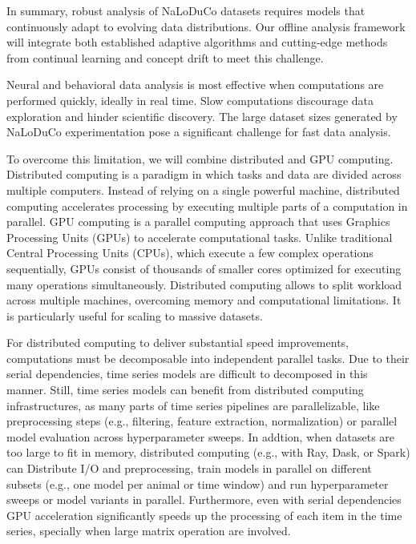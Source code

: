 In summary, robust analysis of NaLoDuCo datasets requires models that
continuously adapt to evolving data distributions. Our offline analysis
framework will integrate both established adaptive algorithms and cutting-edge
methods from continual learning and concept drift to meet this challenge.


Neural and behavioral data analysis is most effective when computations are
performed quickly, ideally in real time. Slow computations discourage data
exploration and hinder scientific discovery. The large dataset sizes generated by
NaLoDuCo experimentation pose a significant challenge for fast data analysis.

To overcome this limitation, we will combine distributed and GPU computing.
%
Distributed computing is a paradigm
in which tasks and data are divided across multiple computers. Instead of
relying on a single powerful machine, distributed computing accelerates
processing by executing multiple parts of a computation in parallel.
%
GPU computing is a parallel computing approach that uses Graphics Processing
Units (GPUs) to accelerate computational tasks. Unlike traditional Central
Processing Units (CPUs), which execute a few complex operations sequentially,
GPUs consist of thousands of smaller cores optimized for executing many
operations simultaneously.
%
%
Distributed computing allows to split workload across multiple machines,
overcoming memory and computational limitations. It is particularly useful for
scaling to massive datasets.

For distributed computing to deliver substantial speed improvements,
computations must be decomposable into independent parallel tasks. Due to their
serial dependencies, time series models are difficult to decomposed in this
manner.
%
Still, time series models can benefit from distributed computing
infrastructures, as many parts of time series pipelines are parallelizable,
like preprocessing steps (e.g., filtering, feature extraction, normalization)
or parallel model evaluation across hyperparameter sweeps.
%
In addtion,  when datasets are too large to fit in memory, distributed
computing (e.g., with Ray, Dask, or Spark) can Distribute I/O and
preprocessing, train models in parallel on different subsets (e.g., one model
per animal or time window) and run hyperparameter sweeps or model variants in
parallel.
%
Furthermore, even with serial dependencies GPU acceleration significantly
speeds up the processing of each item in the time series, specially when large
matrix operation are involved.

